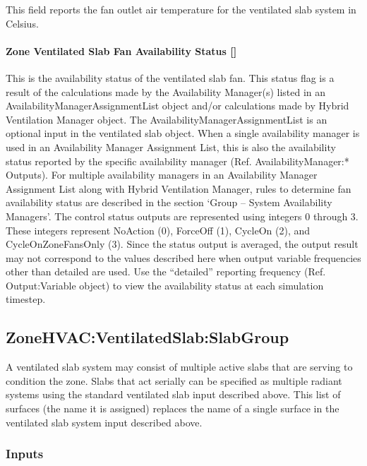 This field reports the fan outlet air temperature for the ventilated slab system in Celsius.

\paragraph{Zone Ventilated Slab Fan Availability Status {[]}}\label{zone-ventilated-slab-fan-availability-status}

This is the availability status of the ventilated slab fan. This status flag is a result of the calculations made by the Availability Manager(s) listed in an AvailabilityManagerAssignmentList object and/or calculations made by Hybrid Ventilation Manager object. The AvailabilityManagerAssignmentList is an optional input in the ventilated slab object. When a single availability manager is used in an Availability Manager Assignment List, this is also the availability status reported by the specific availability manager (Ref. AvailabilityManager:* Outputs). For multiple availability managers in an Availability Manager Assignment List along with Hybrid Ventilation Manager, rules to determine fan availability status are described in the section `Group -- System Availability Managers'. The control status outputs are represented using integers 0 through 3. These integers represent NoAction (0), ForceOff (1), CycleOn (2), and CycleOnZoneFansOnly (3). Since the status output is averaged, the output result may not correspond to the values described here when output variable frequencies other than detailed are used. Use the ``detailed'' reporting frequency (Ref. Output:Variable object) to view the availability status at each simulation timestep.

\subsection{ZoneHVAC:VentilatedSlab:SlabGroup}\label{zonehvacventilatedslabslabgroup}

A ventilated slab system may consist of multiple active slabs that are serving to condition the zone. Slabs that act serially can be specified as multiple radiant systems using the standard ventilated slab input described above. This list of surfaces (the name it is assigned) replaces the name of a single surface in the ventilated slab system input described above.

\subsubsection{Inputs}\label{inputs-11-013}

